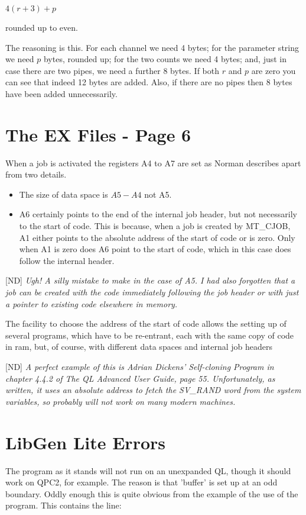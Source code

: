 \begin{center}
$4(r + 3) + p$
\end{center}

rounded up to even.

The reasoning is this. For each channel we need 4 bytes; for the parameter string we need $p$ bytes, rounded up; for the two counts we need 4 bytes; and, just in case there are two pipes, we need a further 8 bytes. If both $r$ and $p$ are zero you can see that indeed 12 bytes are added. Also, if there are no pipes then 8 bytes have been added unnecessarily.

\section{The EX Files - Page 6}
When a job is activated the registers A4 to A7 are set as Norman describes apart from two details.

\begin{itemize}
	\item The size of data space is $A5 - A4$ not A5.
	\item A6 certainly points to the end of the internal job header, but not necessarily to the start of code. This is because, when a job is created by MT\_CJOB, A1 either points to the absolute address of the start of code or is zero. Only when A1 is zero does A6 point to the start of code, which in this case does follow the internal header.
\end{itemize}

[ND] \emph{Ugh! A silly mistake to make in the case of A5. I had also forgotten that a job can be created with the code immediately following the job header or with just a pointer to existing code elsewhere in memory.}

The facility to choose the address of the start of code allows the setting up of several programs, which have to be re-entrant, each with the same copy of code in ram, but, of course, with different data
spaces and internal job headers

[ND] \emph{A perfect example of this is Adrian Dickens' Self-cloning Program in chapter 4.4.2 of The QL Advanced User Guide, page 55. Unfortunately, as written, it uses an absolute address to fetch the SV\_RAND word from the system variables, so probably will not work on many modern machines.}

\section{LibGen Lite Errors}
The program as it stands will not run on an unexpanded QL, though it should work on QPC2, for example. The reason is that 'buffer' is set up at an odd boundary. Oddly enough this is quite obvious from the example of the use of the program. This contains the line:

